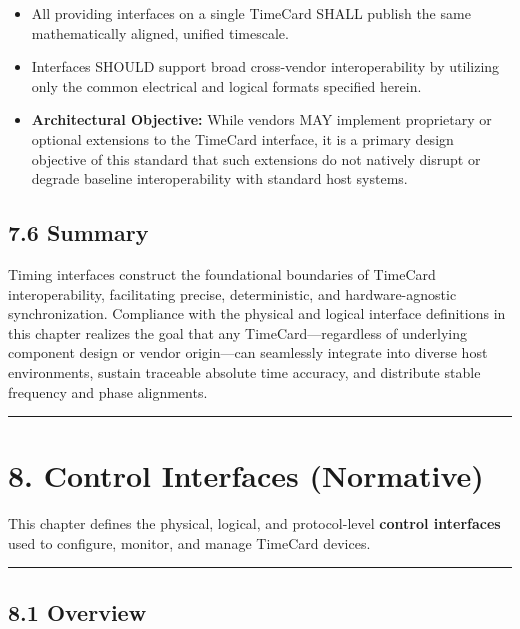 \begin{itemize}
\tightlist
\item
  All providing interfaces on a single TimeCard SHALL publish the same
  mathematically aligned, unified timescale.
\item
  Interfaces SHOULD support broad cross-vendor interoperability by
  utilizing only the common electrical and logical formats specified
  herein.
\item
  \textbf{Architectural Objective:} While vendors MAY implement
  proprietary or optional extensions to the TimeCard interface, it is a
  primary design objective of this standard that such extensions do not
  natively disrupt or degrade baseline interoperability with standard
  host systems.
\end{itemize}

\subsection{7.6 Summary}\label{summary}

Timing interfaces construct the foundational boundaries of TimeCard
interoperability, facilitating precise, deterministic, and
hardware-agnostic synchronization. Compliance with the physical and
logical interface definitions in this chapter realizes the goal that any
TimeCard---regardless of underlying component design or vendor
origin---can seamlessly integrate into diverse host environments,
sustain traceable absolute time accuracy, and distribute stable
frequency and phase alignments.

\begin{center}\rule{0.5\linewidth}{0.5pt}\end{center}

\section{8. Control Interfaces
(Normative)}\label{control-interfaces-normative}

This chapter defines the physical, logical, and protocol-level
\textbf{control interfaces} used to configure, monitor, and manage
TimeCard devices.

\begin{center}\rule{0.5\linewidth}{0.5pt}\end{center}

\subsection{8.1 Overview}\label{overview-2}

